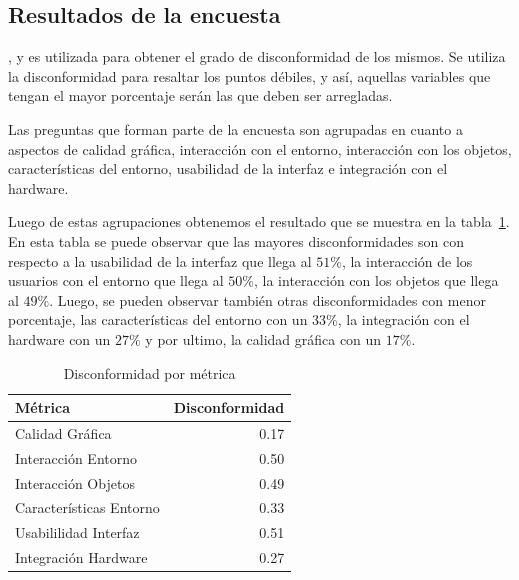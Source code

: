 \subsection{Resultados de la encuesta}
\label{sec:res_interfaz}

, y es utilizada para obtener el grado de
disconformidad de los mismos. Se utiliza la disconformidad para resaltar los
puntos débiles, y así, aquellas variables que tengan el mayor porcentaje serán
las que deben ser arregladas.

Las preguntas que forman parte de la  encuesta son agrupadas en cuanto a
aspectos de calidad gráfica, interacción con el entorno, interacción con los
objetos, características del entorno, usabilidad de la interfaz e integración
con el hardware.

Luego de estas agrupaciones obtenemos el resultado que se muestra en la
tabla~\ref{tab:interfaz_disconformidad_metrica}. En esta tabla se puede observar
que las mayores disconformidades son con respecto a la usabilidad de la interfaz
que llega al $51\%$, la interacción de los usuarios con el entorno que llega al
$50\%$, la interacción con los objetos que llega al $49\%$. Luego, se pueden
observar también otras disconformidades con menor porcentaje, las
características del entorno con un  $33\%$, la integración con el hardware con
un  $27\%$ y por ultimo, la calidad gráfica con un  $17\%$.


\begin{table}[H]
\centering
\begin{tabular}{lr}
\toprule
Métrica & Disconformidad \\
\midrule
Calidad Gráfica         & 0.17 \\
Interacción Entorno     & 0.50\\
Interacción Objetos     & 0.49\\
Características Entorno & 0.33\\
Usabililidad Interfaz   & 0.51\\
Integración Hardware    & 0.27\\
\bottomrule
\end{tabular}
\caption{Disconformidad por métrica}
\label{tab:interfaz_disconformidad_metrica}
\end{table}

